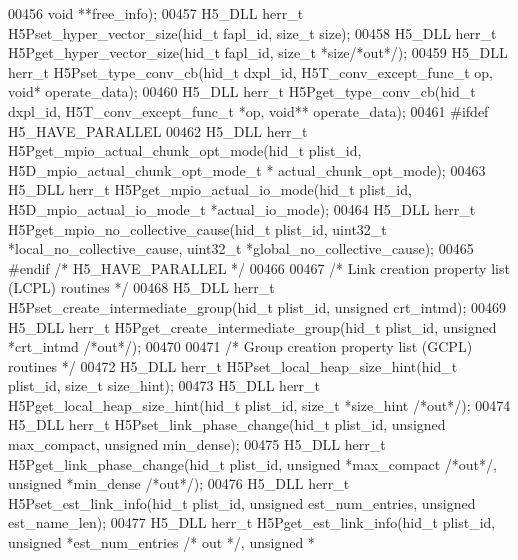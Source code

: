 \begin{DoxyCode}
00456                                        \textcolor{keywordtype}{void} **free\_info);
00457 H5\_DLL herr\_t H5Pset\_hyper\_vector\_size(hid\_t fapl\_id, \textcolor{keywordtype}{size\_t} size);
00458 H5\_DLL herr\_t H5Pget\_hyper\_vector\_size(hid\_t fapl\_id, \textcolor{keywordtype}{size\_t} *size\textcolor{comment}{/*out*/});
00459 H5\_DLL herr\_t H5Pset\_type\_conv\_cb(hid\_t dxpl\_id, H5T\_conv\_except\_func\_t op, \textcolor{keywordtype}{void}* operate\_data);
00460 H5\_DLL herr\_t H5Pget\_type\_conv\_cb(hid\_t dxpl\_id, H5T\_conv\_except\_func\_t *op, \textcolor{keywordtype}{void}** operate\_data);
00461 \textcolor{preprocessor}{#ifdef H5\_HAVE\_PARALLEL}
00462 H5\_DLL herr\_t H5Pget\_mpio\_actual\_chunk\_opt\_mode(hid\_t plist\_id, H5D\_mpio\_actual\_chunk\_opt\_mode\_t *
      actual\_chunk\_opt\_mode);
00463 H5\_DLL herr\_t H5Pget\_mpio\_actual\_io\_mode(hid\_t plist\_id, H5D\_mpio\_actual\_io\_mode\_t *actual\_io\_mode);
00464 H5\_DLL herr\_t H5Pget\_mpio\_no\_collective\_cause(hid\_t plist\_id, uint32\_t *local\_no\_collective\_cause, uint32\_t
       *global\_no\_collective\_cause);
00465 \textcolor{preprocessor}{#endif }\textcolor{comment}{/* H5\_HAVE\_PARALLEL */}\textcolor{preprocessor}{}
00466 
00467 \textcolor{comment}{/* Link creation property list (LCPL) routines */}
00468 H5\_DLL herr\_t H5Pset\_create\_intermediate\_group(hid\_t plist\_id, \textcolor{keywordtype}{unsigned} crt\_intmd);
00469 H5\_DLL herr\_t H5Pget\_create\_intermediate\_group(hid\_t plist\_id, \textcolor{keywordtype}{unsigned} *crt\_intmd \textcolor{comment}{/*out*/});
00470 
00471 \textcolor{comment}{/* Group creation property list (GCPL) routines */}
00472 H5\_DLL herr\_t H5Pset\_local\_heap\_size\_hint(hid\_t plist\_id, \textcolor{keywordtype}{size\_t} size\_hint);
00473 H5\_DLL herr\_t H5Pget\_local\_heap\_size\_hint(hid\_t plist\_id, \textcolor{keywordtype}{size\_t} *size\_hint \textcolor{comment}{/*out*/});
00474 H5\_DLL herr\_t H5Pset\_link\_phase\_change(hid\_t plist\_id, \textcolor{keywordtype}{unsigned} max\_compact, \textcolor{keywordtype}{unsigned} min\_dense);
00475 H5\_DLL herr\_t H5Pget\_link\_phase\_change(hid\_t plist\_id, \textcolor{keywordtype}{unsigned} *max\_compact \textcolor{comment}{/*out*/}, \textcolor{keywordtype}{unsigned} *min\_dense \textcolor{comment}{
      /*out*/});
00476 H5\_DLL herr\_t H5Pset\_est\_link\_info(hid\_t plist\_id, \textcolor{keywordtype}{unsigned} est\_num\_entries, \textcolor{keywordtype}{unsigned} est\_name\_len);
00477 H5\_DLL herr\_t H5Pget\_est\_link\_info(hid\_t plist\_id, \textcolor{keywordtype}{unsigned} *est\_num\_entries \textcolor{comment}{/* out */}, \textcolor{keywordtype}{unsigned} *

\end{DoxyCode}
